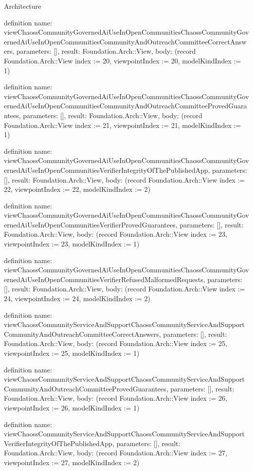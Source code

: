 \begin{lexlean}{Architecture}
\begin{semanticmodule}
definition{
  name: viewChaossCommunityGovernedAiUseInOpenCommunitiesChaossCommunityGovernedAiUseInOpenCommunitiesCommunityAndOutreachCommitteeCorrectAnswers,
  parameters: [],
  result: Foundation.Arch::View,
  body: (record Foundation.Arch::View {index := 20, viewpointIndex := 20, modelKindIndex := 1})
}

definition{
  name: viewChaossCommunityGovernedAiUseInOpenCommunitiesChaossCommunityGovernedAiUseInOpenCommunitiesCommunityAndOutreachCommitteeProvedGuarantees,
  parameters: [],
  result: Foundation.Arch::View,
  body: (record Foundation.Arch::View {index := 21, viewpointIndex := 21, modelKindIndex := 1})
}

definition{
  name: viewChaossCommunityGovernedAiUseInOpenCommunitiesChaossCommunityGovernedAiUseInOpenCommunitiesVerifierIntegrityOfThePublishedApp,
  parameters: [],
  result: Foundation.Arch::View,
  body: (record Foundation.Arch::View {index := 22, viewpointIndex := 22, modelKindIndex := 2})
}

definition{
  name: viewChaossCommunityGovernedAiUseInOpenCommunitiesChaossCommunityGovernedAiUseInOpenCommunitiesVerifierProvedGuarantees,
  parameters: [],
  result: Foundation.Arch::View,
  body: (record Foundation.Arch::View {index := 23, viewpointIndex := 23, modelKindIndex := 1})
}

definition{
  name: viewChaossCommunityGovernedAiUseInOpenCommunitiesChaossCommunityGovernedAiUseInOpenCommunitiesVerifierRefusedMalformedRequests,
  parameters: [],
  result: Foundation.Arch::View,
  body: (record Foundation.Arch::View {index := 24, viewpointIndex := 24, modelKindIndex := 2})
}

definition{
  name: viewChaossCommunityServiceAndSupportChaossCommunityServiceAndSupportCommunityAndOutreachCommitteeCorrectAnswers,
  parameters: [],
  result: Foundation.Arch::View,
  body: (record Foundation.Arch::View {index := 25, viewpointIndex := 25, modelKindIndex := 1})
}

definition{
  name: viewChaossCommunityServiceAndSupportChaossCommunityServiceAndSupportCommunityAndOutreachCommitteeProvedGuarantees,
  parameters: [],
  result: Foundation.Arch::View,
  body: (record Foundation.Arch::View {index := 26, viewpointIndex := 26, modelKindIndex := 1})
}

definition{
  name: viewChaossCommunityServiceAndSupportChaossCommunityServiceAndSupportVerifierIntegrityOfThePublishedApp,
  parameters: [],
  result: Foundation.Arch::View,
  body: (record Foundation.Arch::View {index := 27, viewpointIndex := 27, modelKindIndex := 2})
}


\end{semanticmodule}
\end{lexlean}
